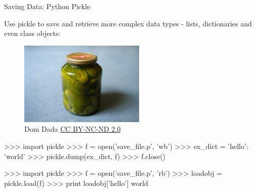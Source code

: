 \documentclass[xcolor=table,10pt,handout]{beamer}
\begin{document}
\begin{frame}[fragile]{Saving Data: Python Pickle}

  Use pickle to save and retrieve more complex data types - lists,
  dictionaries and even class objects:

  \bigskip\pause

  \begin{figure}
    \centering
    \includegraphics[width=6cm]{pickle.jpg}
    \caption*{\scriptsize  \textcopyright Dom Dada \href{http://creativecommons.org/licenses/by-nc-nd/2.0/}{CC BY-NC-ND 2.0}}
  \end{figure}
  
  \vspace{-5.6cm}
  \begin{mlinepython}
    >>> import pickle 
    >>> f = open('save_file.p', 'wb')
    >>> ex_dict = {'hello': 'world'}
    >>> pickle.dump(ex_dict, f)
    >>> f.close()
  \end{mlinepython}

  \bigskip{}

  \begin{mlinepython}
    >>> import pickle 
    >>> f = open('save_file.p', 'rb')
    >>> loadobj = pickle.load(f)
    >>> print loadobj['hello']
    world
  \end{mlinepython}

\end{frame}
\end{document}
